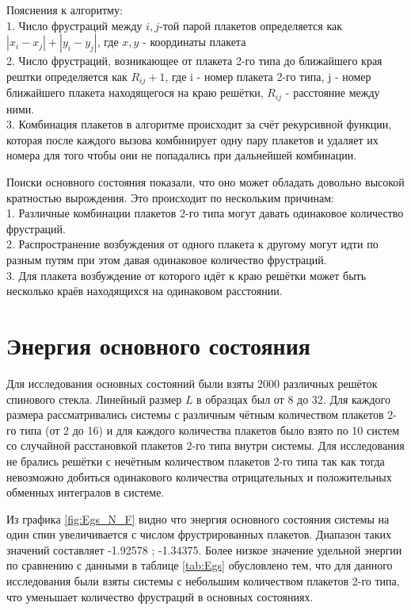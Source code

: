 \documentclass[utf8, babel, sor, jor, amsmath, amssymb, reprint]{elsarticle} %
\begin{document}
Пояснения к алгоритму:\\
1. Число фрустраций между $i,j$-той парой плакетов определяется как $\left|x_i-x_j\right|+\left|y_i-y_j\right|$, где $x, y$ - координаты плакета\\
2. Число фрустраций, возникающее от плакета 2-го типа до ближайшего края рештки определяется как $R_{ij}+1$, где i - номер плакета 2-го типа, j - номер ближайшего плакета находящегося на краю решётки, $R_{ij}$ - расстояние между ними.\\
3. Комбинация плакетов в алгоритме происходит за счёт рекурсивной функции, которая после каждого вызова комбинирует одну пару плакетов и удаляет их номера для того чтобы они не попадались при дальнейшей комбинации. 

Поиски основного состояния показали, что оно может обладать довольно высокой кратностью вырождения. Это происходит по нескольким причинам:\\
1. Различные комбинации плакетов 2-го типа могут давать одинаковое количество фрустраций.\\
2. Распространение возбуждения от одного плакета к другому могут идти по разным путям при этом давая одинаковое количество фрустраций.\\
3. Для плакета возбуждение от которого идёт к краю решётки может быть несколько краёв находящихся на одинаковом расстоянии.\\

\section{Энергия основного состояния}
Для исследования основных состояний были взяты 2000 различных решёток спинового стекла. Линейный размер $L$ в образцах был от 8 до 32.
Для каждого размера рассматривались системы с различным чётным количеством плакетов 2-го типа (от 2 до 16) и для каждого количества плакетов было взято по 10 систем со случайной расстановкой плакетов 2-го типа внутри системы. Для исследования не  брались решётки с нечётным количеством плакетов 2-го типа так как тогда невозможно добиться одинакового количества отрицательных и положительных обменных интегралов в системе. 

Из графика \ref{fig:Egs_N_F} видно что энергия основного состояния системы на один спин увеличивается с числом фрустрированных плакетов. Диапазон таких значений составляет -1.92578 ; -1.34375. Более низкое значение удельной энергии по сравнению с данными в таблице \ref{tab:Egs} обусловлено тем, что для данного исследования были взяты системы с небольшим количеством плакетов 2-го типа, что уменьшает количество фрустраций в основных состояниях.
\end{document}
